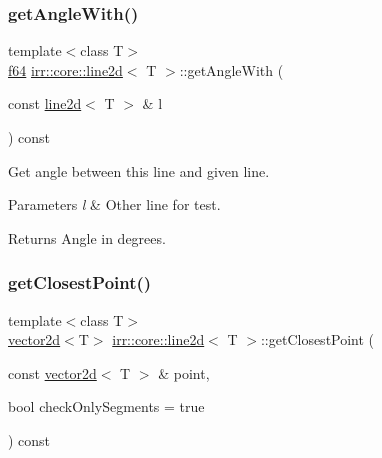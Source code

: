 \subsubsection{\texorpdfstring{get\+Angle\+With()}{getAngleWith()}}
{\footnotesize\ttfamily template$<$class T$>$ \\
\hyperlink{namespaceirr_a1325b02603ad449f92c68fc640af9b28}{f64} \hyperlink{classirr_1_1core_1_1line2d}{irr\+::core\+::line2d}$<$ T $>$\+::get\+Angle\+With (\begin{DoxyParamCaption}\item[{const \hyperlink{classirr_1_1core_1_1line2d}{line2d}$<$ T $>$ \&}]{l }\end{DoxyParamCaption}) const\hspace{0.3cm}{\ttfamily [inline]}}



Get angle between this line and given line. 


\begin{DoxyParams}{Parameters}
{\em l} & Other line for test. \\
\hline
\end{DoxyParams}
\begin{DoxyReturn}{Returns}
Angle in degrees. 
\end{DoxyReturn}
\mbox{\label{classirr_1_1core_1_1line2d_af049709fbc870bdc317ec27df95280cb}} 
\subsubsection{\texorpdfstring{get\+Closest\+Point()}{getClosestPoint()}}
{\footnotesize\ttfamily template$<$class T$>$ \\
\hyperlink{classirr_1_1core_1_1vector2d}{vector2d}$<$T$>$ \hyperlink{classirr_1_1core_1_1line2d}{irr\+::core\+::line2d}$<$ T $>$\+::get\+Closest\+Point (\begin{DoxyParamCaption}\item[{const \hyperlink{classirr_1_1core_1_1vector2d}{vector2d}$<$ T $>$ \&}]{point,  }\item[{bool}]{check\+Only\+Segments = {\ttfamily true} }\end{DoxyParamCaption}) const\hspace{0.3cm}{\ttfamily [inline]}}



